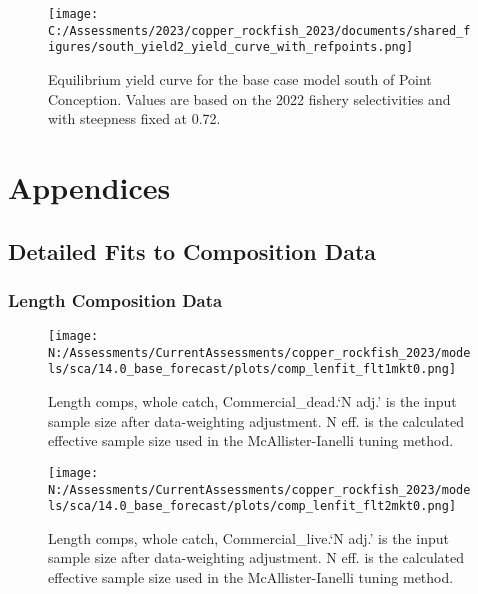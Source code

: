 \documentclass[11pt,
  english,
  letterpaper,
]{article}
\begin{document}
\pagebreak

\begin{figure}
\centering
\texttt{[image: C:/Assessments/2023/copper\_rockfish\_2023/documents/shared\_figures/south\_yield2\_yield\_curve\_with\_refpoints.png]}
\caption{Equilibrium yield curve for the base case model south of Point Conception. Values are based on the 2022 fishery selectivities and with steepness fixed at 0.72.\label{fig:yield-south}}
\end{figure}

\pagebreak

\hypertarget{appendices}{%
\section{Appendices}\label{appendices}}

\hypertarget{detailed-fit-comps}{%
\subsection{Detailed Fits to Composition Data}\label{detailed-fit-comps}}

\hypertarget{length-data}{%
\subsubsection{Length Composition Data}\label{length-data}}

\begin{figure}
\centering
\texttt{[image: N:/Assessments/CurrentAssessments/copper\_rockfish\_2023/models/sca/14.0\_base\_forecast/plots/comp\_lenfit\_flt1mkt0.png]}
\caption{Length comps, whole catch, Commercial\_dead.`N adj.' is the input sample size after data-weighting adjustment. N eff. is the calculated effective sample size used in the McAllister-Ianelli tuning method.\label{fig:comp_lenfit_flt1mkt0}}
\end{figure}

\begin{figure}
\centering
\texttt{[image: N:/Assessments/CurrentAssessments/copper\_rockfish\_2023/models/sca/14.0\_base\_forecast/plots/comp\_lenfit\_flt2mkt0.png]}
\caption{Length comps, whole catch, Commercial\_live.`N adj.' is the input sample size after data-weighting adjustment. N eff. is the calculated effective sample size used in the McAllister-Ianelli tuning method.\label{fig:comp_lenfit_flt2mkt0}}
\end{figure}
\end{document}
